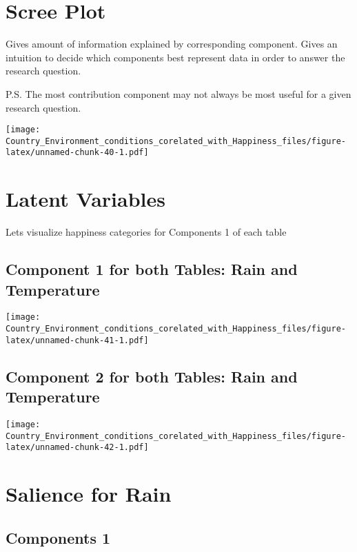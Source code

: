 \documentclass[]{book}
\begin{document}
\hypertarget{scree-plot-2}{%
\section{Scree Plot}\label{scree-plot-2}}

Gives amount of information explained by corresponding component. Gives
an intuition to decide which components best represent data in order to
answer the research question.

P.S. The most contribution component may not always be most useful for a
given research question.

\texttt{[image: Country\_Environment\_conditions\_corelated\_with\_Happiness\_files/figure-latex/unnamed-chunk-40-1.pdf]}

\hypertarget{latent-variables}{%
\section{Latent Variables}\label{latent-variables}}

Lets visualize happiness categories for Components 1 of each table

\hypertarget{component-1-for-both-tables-rain-and-temperature}{%
\subsection{Component 1 for both Tables: Rain and
Temperature}\label{component-1-for-both-tables-rain-and-temperature}}

\texttt{[image: Country\_Environment\_conditions\_corelated\_with\_Happiness\_files/figure-latex/unnamed-chunk-41-1.pdf]}

\hypertarget{component-2-for-both-tables-rain-and-temperature}{%
\subsection{Component 2 for both Tables: Rain and
Temperature}\label{component-2-for-both-tables-rain-and-temperature}}

\texttt{[image: Country\_Environment\_conditions\_corelated\_with\_Happiness\_files/figure-latex/unnamed-chunk-42-1.pdf]}

\hypertarget{salience-for-rain}{%
\section{Salience for Rain}\label{salience-for-rain}}

\hypertarget{components-1}{%
\subsection{Components 1}\label{components-1}}
\end{document}
